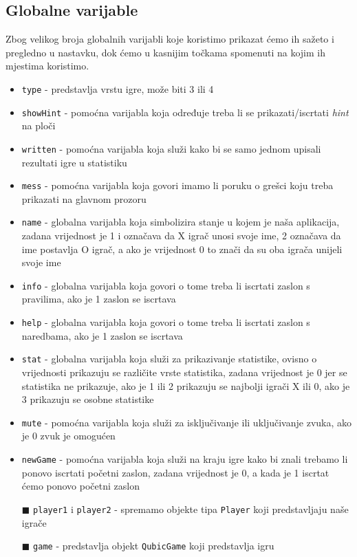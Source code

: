 \documentclass[12pt]{scrartcl}
\begin{document}
\subsection{Globalne varijable}\label{subsec:var}
Zbog velikog broja globalnih varijabli koje koristimo prikazat ćemo ih sažeto i pregledno u nastavku, dok ćemo u kasnijim točkama spomenuti na kojim ih mjestima koristimo. 
\begin{itemize}
    \item \texttt{type} - predstavlja vrstu igre, može biti 3 ili 4
    \item \texttt{showHint} - pomoćna varijabla koja određuje treba li se prikazati/iscrtati \emph{hint} na ploči
    \item \texttt{written} - pomoćna varijabla koja služi kako bi se samo jednom upisali rezultati igre u statistiku
    \item \texttt{mess} - pomoćna varijabla koja govori imamo li poruku o grešci koju treba prikazati na glavnom prozoru
    \item \texttt{name} - globalna varijabla koja simbolizira stanje u kojem je naša aplikacija, zadana vrijednost je 1 i označava da X igrač unosi svoje ime, 2 označava da ime postavlja O igrač, a ako je vrijednost 0 to znači da su oba igrača unijeli svoje ime
    \item \texttt{info} - globalna varijabla koja govori o tome treba li iscrtati zaslon s pravilima, ako je 1 zaslon se iscrtava
    \item \texttt{help} - globalna varijabla koja govori o tome treba li iscrtati zaslon s naredbama, ako je 1 zaslon se iscrtava
    \item \texttt{stat} - globalna varijabla koja služi za prikazivanje statistike, ovisno o vrijednosti prikazuju se različite vrste statistika, zadana vrijednost je 0 jer se statistika ne prikazuje, ako je 1 ili 2 prikazuju se najbolji igrači X ili 0, ako je 3 prikazuju se osobne statistike
    \item \texttt{mute} - pomoćna varijabla koja služi za isključivanje ili uključivanje zvuka, ako je 0 zvuk je omogućen
    \item \texttt{newGame} - pomoćna varijabla koja služi na kraju igre kako bi znali trebamo li ponovo iscrtati početni zaslon, zadana vrijednost je 0, a kada je 1 iscrtat ćemo ponovo početni zaslon
    \item[$\blacksquare$] \texttt{player1} i \texttt{player2} - spremamo objekte tipa \texttt{Player} koji predstavljaju naše igrače
    \item[$\blacksquare$] \texttt{game} - predstavlja objekt \texttt{QubicGame} koji predstavlja igru 

\end{itemize}
\end{document}
